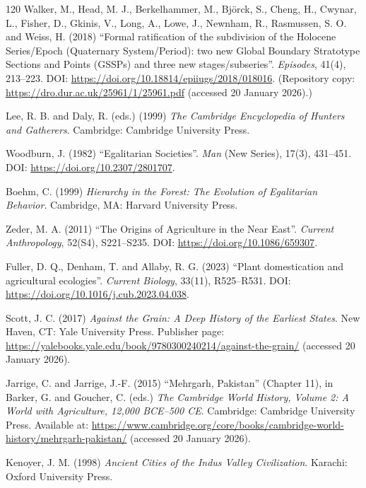 \begin{singlespace}
\begin{thebibliography}{120}
Walker, M., Head, M. J., Berkelhammer, M., Bj\"orck, S., Cheng, H., Cwynar, L., Fisher, D., Gkinis, V., Long, A., Lowe, J., Newnham, R., Rasmussen, S. O. and Weiss, H. (2018)
``Formal ratification of the subdivision of the Holocene Series/Epoch (Quaternary System/Period): two new Global Boundary Stratotype Sections and Points (GSSPs) and three new stages/subseries''.
\emph{Episodes}, 41(4), 213--223.
DOI: \url{https://doi.org/10.18814/epiiugs/2018/018016}.
(Repository copy: \url{https://dro.dur.ac.uk/25961/1/25961.pdf} (accessed 20 January 2026).)

Lee, R. B. and Daly, R. (eds.) (1999) \emph{The Cambridge Encyclopedia of Hunters and Gatherers}.
Cambridge: Cambridge University Press.

Woodburn, J. (1982) ``Egalitarian Societies''.
\emph{Man} (New Series), 17(3), 431--451.
DOI: \url{https://doi.org/10.2307/2801707}.

Boehm, C. (1999) \emph{Hierarchy in the Forest: The Evolution of Egalitarian Behavior}.
Cambridge, MA: Harvard University Press.

Zeder, M. A. (2011) ``The Origins of Agriculture in the Near East''.
\emph{Current Anthropology}, 52(S4), S221--S235.
DOI: \url{https://doi.org/10.1086/659307}.

Fuller, D. Q., Denham, T. and Allaby, R. G. (2023) ``Plant domestication and agricultural ecologies''.
\emph{Current Biology}, 33(11), R525--R531.
DOI: \url{https://doi.org/10.1016/j.cub.2023.04.038}.

Scott, J. C. (2017) \emph{Against the Grain: A Deep History of the Earliest States}.
New Haven, CT: Yale University Press.
Publisher page: \url{https://yalebooks.yale.edu/book/9780300240214/against-the-grain/} (accessed 20 January 2026).


Jarrige, C. and Jarrige, J.-F. (2015) ``Mehrgarh, Pakistan'' (Chapter 11),
in Barker, G. and Goucher, C. (eds.) \emph{The Cambridge World History, Volume 2: A World with Agriculture, 12,000 BCE--500 CE}.
Cambridge: Cambridge University Press.
Available at: \url{https://www.cambridge.org/core/books/cambridge-world-history/mehrgarh-pakistan/} (accessed 20 January 2026).

Kenoyer, J. M. (1998) \emph{Ancient Cities of the Indus Valley Civilization}.
Karachi: Oxford University Press.


\end{thebibliography}
\end{singlespace}
